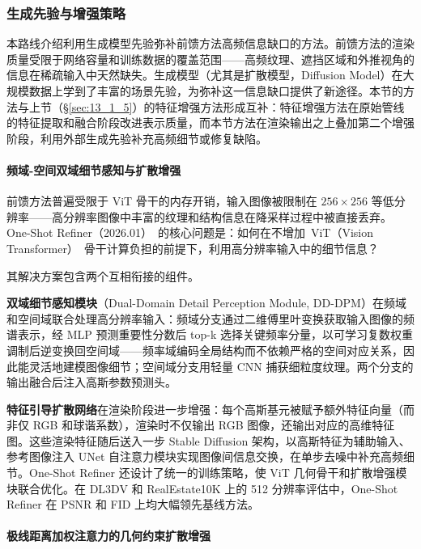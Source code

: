 \subsubsection{生成先验与增强策略}
\label{sec:13_1_6}

本路线介绍利用生成模型先验弥补前馈方法高频信息缺口的方法。前馈方法的渲染质量受限于网络容量和训练数据的覆盖范围——高频纹理、遮挡区域和外推视角的信息在稀疏输入中天然缺失。生成模型（尤其是扩散模型，Diffusion Model）在大规模数据上学到了丰富的场景先验，为弥补这一信息缺口提供了新途径。本节的方法与上节（\S\ref{sec:13_1_5}）的特征增强方法形成互补：特征增强方法在原始管线的特征提取和融合阶段改进表示质量，而本节方法在渲染输出之上叠加第二个增强阶段，利用外部生成先验补充高频细节或修复缺陷。

\paragraph{频域-空间双域细节感知与扩散增强}

前馈方法普遍受限于 ViT 骨干的内存开销，输入图像被限制在 $256 \times 256$ 等低分辨率——高分辨率图像中丰富的纹理和结构信息在降采样过程中被直接丢弃。One-Shot Refiner（2026.01）~\cite{2601_14161}的核心问题是：如何在不增加~ViT（Vision Transformer）~骨干计算负担的前提下，利用高分辨率输入中的细节信息？

其解决方案包含两个互相衔接的组件。

\textbf{双域细节感知模块}（Dual-Domain Detail Perception Module, DD-DPM）在频域和空间域联合处理高分辨率输入：频域分支通过二维傅里叶变换获取输入图像的频谱表示，经 MLP 预测重要性分数后 top-k 选择关键频率分量，以可学习复数权重调制后逆变换回空间域——频率域编码全局结构而不依赖严格的空间对应关系，因此能灵活地建模图像细节；空间域分支用轻量 CNN 捕获细粒度纹理。两个分支的输出融合后注入高斯参数预测头。

\textbf{特征引导扩散网络}在渲染阶段进一步增强：每个高斯基元被赋予额外特征向量（而非仅 RGB 和球谐系数），渲染时不仅输出 RGB 图像，还输出对应的高维特征图。这些渲染特征随后送入一步 Stable Diffusion 架构，以高斯特征为辅助输入、参考图像注入 UNet 自注意力模块实现图像间信息交换，在单步去噪中补充高频细节。One-Shot Refiner 还设计了统一的训练策略，使 ViT 几何骨干和扩散增强模块联合优化。在 DL3DV 和 RealEstate10K 上的 512 分辨率评估中，One-Shot Refiner 在 PSNR 和 FID 上均大幅领先基线方法。

\paragraph{极线距离加权注意力的几何约束扩散增强}

